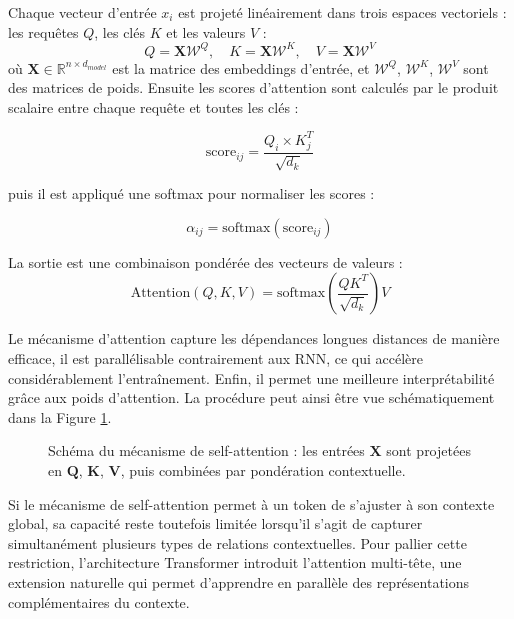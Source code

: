 Chaque vecteur d'entrée $x_i$ est projeté linéairement dans trois espaces vectoriels : les requêtes $Q$, les clés $K$ et les valeurs $V$ :
\begin{equation}
Q = \mathbf{X}\mathcal{W}^Q, \quad K = \mathbf{X}\mathcal{W}^K, \quad V = \mathbf{X}\mathcal{W}^V
\end{equation}
où $\mathbf{X} \in \mathbb{R}^{n \times d_{model}}$ est la matrice des embeddings d'entrée, et $\mathcal{W}^Q$, $\mathcal{W}^K$, $\mathcal{W}^V$ sont des matrices de poids. Ensuite les scores d'attention sont calculés par le produit scalaire entre chaque requête et toutes les clés :

\begin{equation}
\text{score}_{ij} = \frac{Q_i \times K_j^T}{\sqrt{d_k}}
\end{equation}

puis il est appliqué une softmax pour normaliser les scores :

\begin{equation}
\alpha_{ij} = \text{softmax}(\text{score}_{ij})
\end{equation}

La sortie est une combinaison pondérée des vecteurs de valeurs :
\begin{equation}
\text{Attention}(Q, K, V) = \text{softmax}\left(\frac{QK^T}{\sqrt{d_k}}\right)V 
\end{equation}

Le mécanisme d'attention capture les dépendances longues distances de manière efficace, il est parallélisable contrairement aux RNN, ce qui accélère considérablement l'entraînement. Enfin, il permet une meilleure interprétabilité grâce aux poids d’attention. La procédure peut ainsi être vue schématiquement dans la Figure \ref{fig:self_attention_diagram}.

\begin{figure}[H]
    \centering
    
    \caption{Schéma du mécanisme de self-attention : les entrées $\mathbf{X}$ sont projetées en $\mathbf{Q}$, $\mathbf{K}$, $\mathbf{V}$, puis combinées par pondération contextuelle.}
    \label{fig:self_attention_diagram}
\end{figure}

Si le mécanisme de self-attention permet à un token de s'ajuster à son contexte global, sa capacité reste toutefois limitée lorsqu’il s’agit de capturer simultanément plusieurs types de relations contextuelles. Pour pallier cette restriction, l’architecture Transformer introduit l’attention multi-tête, une extension naturelle qui permet d’apprendre en parallèle des représentations complémentaires du contexte.

